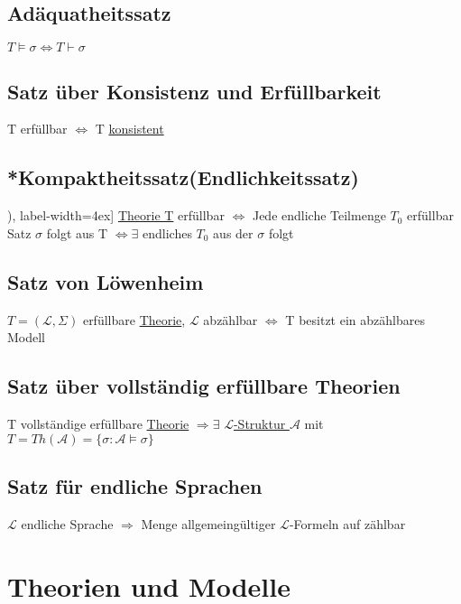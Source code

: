 \documentclass[12pt,a4paper]{article} %
\begin{document}
	\subsection{Adäquatheitssatz}
	$T \hyperref[Erfullbar]{\vDash} \sigma \Leftrightarrow T \hyperref[Beweisbar]{\vdash} \sigma$
	
	\subsection{Satz über Konsistenz und Erfüllbarkeit}
	T erfüllbar $\Leftrightarrow$ T \hyperref[PLKonsistent]{konsistent}
	
	\subsection{*Kompaktheitssatz(Endlichkeitssatz)}
	\begin{tasks}[counter-format=(tsk[r]), label-width=4ex]
		\task \hyperref[Theorie]{Theorie T} erfüllbar $\Leftrightarrow$ Jede endliche Teilmenge $T_0$ erfüllbar 
		\task Satz $\sigma$ folgt aus T $\Leftrightarrow \exists$ endliches $T_0$ aus der $\sigma$ folgt
	\end{tasks}

	\subsection{Satz von Löwenheim}
	$T = (\mathcal{L}, \Sigma)$ erfüllbare \hyperref[Theorie]{Theorie}, $\mathcal{L}$ abzählbar \newline
	$\Leftrightarrow$ T besitzt ein abzählbares Modell
	
	\subsection{Satz über vollständig erfüllbare Theorien}
	T vollständige erfüllbare \hyperref[Theorie]{Theorie} \newline 
	$\Rightarrow \exists$ \hyperref[Struktur]{$\mathcal{L}$-Struktur $\mathcal{A}$} mit $T = Th(\mathcal{A}) = \{\sigma : \mathcal{A} \hyperref[Erfullbar]{\vDash} \sigma\}$
	
	\subsection{Satz für endliche Sprachen}
	$\mathcal{L}$ endliche Sprache $\Rightarrow$ Menge allgemeingültiger $\mathcal{L}$-Formeln auf zählbar 
	
	\newpage
	\section{Theorien und Modelle}
\end{document}
